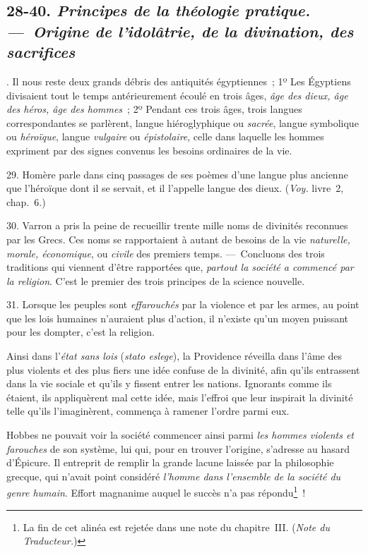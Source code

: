 \documentclass[french,twoside]{book} %
\begin{document}
\subsection[{28-40. Principes de la théologie pratique. — Origine de l’idolâtrie, de la divination, des sacrifices}]{ \textsc{28-40. } {\itshape Principes de la théologie pratique. — Origine de l’idolâtrie, de la divination, des sacrifices} }
. Il nous reste deux grands débris des antiquités égyptiennes ; 1º Les Égyptiens divisaient tout le temps antérieurement écoulé en trois âges, {\itshape âge des dieux, âge des héros, âge des hommes} ; 2º Pendant ces trois âges, trois langues correspondantes se parlèrent, langue hiéroglyphique ou {\itshape sacrée}, langue symbolique ou {\itshape héroïque}, langue {\itshape vulgaire} ou {\itshape épistolaire}, celle dans laquelle les hommes expriment par des signes convenus les besoins ordinaires de la vie.\par
29. Homère parle dans cinq passages de ses poèmes d’une langue plus ancienne que l’héroïque dont il se servait, et il l’appelle langue des dieux. ({\itshape Voy.} livre 2, chap. 6.)\par
30. Varron a pris la peine de recueillir trente mille noms de divinités reconnues par les Grecs. Ces noms se rapportaient à autant de besoins de la vie {\itshape naturelle, morale, économique}, ou {\itshape civile} des premiers temps. — Concluons des trois traditions qui  viennent d’être rapportées que, {\itshape partout la société a commencé par la religion}. C’est le premier des trois principes de la science nouvelle.\par
31. Lorsque les peuples sont {\itshape effarouchés} par la violence et par les armes, au point que les lois humaines n’auraient plus d’action, il n’existe qu’un moyen puissant pour les dompter, c’est la religion.\par
Ainsi dans l’{\itshape état sans lois} ({\itshape stato eslege}), la Providence réveilla dans l’âme des plus violents et des plus fiers une idée confuse de la divinité, afin qu’ils entrassent dans la vie sociale et qu’ils y fissent entrer les nations. Ignorants comme ils étaient, ils appliquèrent mal cette idée, mais l’effroi que leur inspirait la divinité telle qu’ils l’imaginèrent, commença à ramener l’ordre parmi eux.\par
Hobbes ne pouvait voir la société commencer ainsi parmi {\itshape les hommes violents et farouches} de son système, lui qui, pour en trouver l’origine, s’adresse au hasard d’Épicure. Il entreprit de remplir la grande lacune laissée par la philosophie grecque, qui n’avait point considéré {\itshape l’homme dans l’ensemble de la société du genre humain}. Effort magnanime auquel le succès n’a pas répondu\footnote{La fin de cet alinéa est rejetée dans une note du chapitre III. ({\itshape Note du Traducteur.})} !\par
\end{document}
